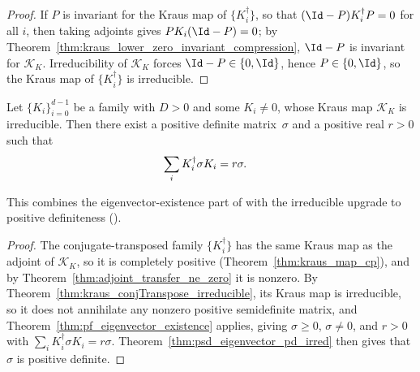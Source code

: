 \begin{proof}\leanok
    If $P$ is invariant for the Kraus map of $\{K_i^\dagger\}$, so that
    $(\Id-P)K_i^\dagger P=0$ for all $i$, then taking adjoints gives
    $PK_i(\Id-P)=0$; by
    Theorem~\ref{thm:kraus_lower_zero_invariant_compression}, $\Id-P$ is
    invariant for $\mathcal K_K$.
    Irreducibility of $\mathcal K_K$ forces $\Id-P \in \{0,\Id\}$, hence
    $P \in \{0,\Id\}$, so the Kraus map of $\{K_i^\dagger\}$ is irreducible.
\end{proof}

\begin{theorem}%
    \label{thm:kraus_posdef_adjoint_eigenvector}
    \leanok
    Let $\{K_i\}_{i=0}^{d-1}$ be a family with $D > 0$ and some
    $K_i \neq 0$, whose Kraus map $\mathcal K_K$ is irreducible. Then there
    exist a positive definite matrix~$\sigma$ and a positive real $r > 0$
    such that
    \begin{align}
        \sum_i K_i^\dagger \sigma K_i
         & = r\sigma.
        \notag
    \end{align}

    This combines the eigenvector-existence part of
    \cite[Theorem~6.5]{Wolf2012Quantum} with the irreducible upgrade to
    positive definiteness (\cite[Theorem~6.3(2)]{Wolf2012Quantum}).
\end{theorem}

\begin{proof}\leanok
    The conjugate-transposed family $\{K_i^\dagger\}$ has the same Kraus map
    as the adjoint of $\mathcal K_K$, so it is completely positive
    (Theorem~\ref{thm:kraus_map_cp}), and by
    Theorem~\ref{thm:adjoint_transfer_ne_zero} it is nonzero. By
    Theorem~\ref{thm:kraus_conjTranspose_irreducible}, its Kraus map is
    irreducible, so it does not annihilate any nonzero positive semidefinite
    matrix, and
    Theorem~\ref{thm:pf_eigenvector_existence} applies, giving
    $\sigma \ge 0$, $\sigma \neq 0$, and $r > 0$ with
    $\sum_i K_i^\dagger \sigma K_i = r\sigma$.
    Theorem~\ref{thm:psd_eigenvector_pd_irred} then gives that $\sigma$ is
    positive definite.
\end{proof}

